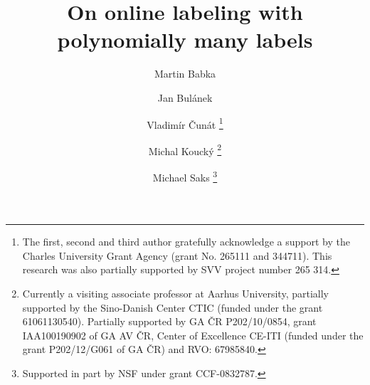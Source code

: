 \documentclass[runningheads,a4paper]{llncs}
\begin{document}
\mainmatter  %

\title{On online labeling with polynomially many labels}

%
%
\author{Martin Babka%
\and Jan Bul\'anek%
\and Vladim\'ir \v{C}un\'at
\thanks{The first, second and third author gratefully acknowledge a support by the Charles University Grant Agency (grant No. 265111 and 344711). This research was also partially supported by SVV project number 265 314.}%
\and Michal Kouck\'y
\thanks{Currently a visiting associate professor at Aarhus University, partially supported by the Sino-Danish Center CTIC (funded under the grant 61061130540).
Partially supported by GA \v{C}R P202/10/0854, grant IAA100190902 of GA AV \v{C}R, Center of Excellence CE-ITI (funded under the grant P202/12/G061 of GA \v{C}R) and RVO: 67985840.}
\and Michael Saks
\thanks{Supported in part by NSF under  grant CCF-0832787.}
}



%

\end{document}
